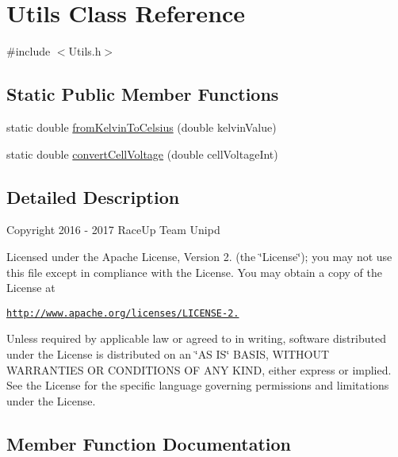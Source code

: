 \hypertarget{class_utils}{}\section{Utils Class Reference}
\label{class_utils}


{\ttfamily \#include $<$Utils.\+h$>$}

\subsection*{Static Public Member Functions}
\begin{DoxyCompactItemize}
\item 
static double \hyperlink{class_utils_a48f594cd17936f0bd44d268695eae482}{from\+Kelvin\+To\+Celsius} (double kelvin\+Value)
\item 
static double \hyperlink{class_utils_a767790e66f3770818054ea2479db7941}{convert\+Cell\+Voltage} (double cell\+Voltage\+Int)
\end{DoxyCompactItemize}


\subsection{Detailed Description}
Copyright 2016 -\/ 2017 Race\+Up Team Unipd

Licensed under the Apache License, Version 2. (the \char`\"{}\+License\char`\"{}); you may not use this file except in compliance with the License. You may obtain a copy of the License at

\href{http://www.apache.org/licenses/LICENSE-2.0}{\tt http\+://www.\+apache.\+org/licenses/\+L\+I\+C\+E\+N\+S\+E-\/2.}

Unless required by applicable law or agreed to in writing, software distributed under the License is distributed on an \char`\"{}\+A\+S I\+S\char`\"{} B\+A\+S\+IS, W\+I\+T\+H\+O\+UT W\+A\+R\+R\+A\+N\+T\+I\+ES OR C\+O\+N\+D\+I\+T\+I\+O\+NS OF A\+NY K\+I\+ND, either express or implied. See the License for the specific language governing permissions and limitations under the License. 

\subsection{Member Function Documentation}
